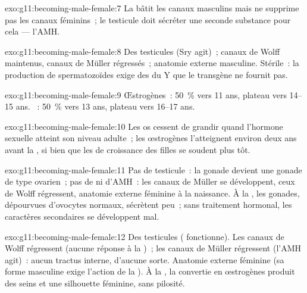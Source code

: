 \begin{solution}{exo:g11:becoming-male-female:7}
La  bâtit les canaux masculins mais ne supprime pas les
canaux féminins~; le testicule doit sécréter une seconde substance pour
cela --- l'AMH.
\end{solution}

\begin{solution}{exo:g11:becoming-male-female:8}
Des testicules (Sry agit)~; canaux de Wolff maintenus, canaux de Müller
régressés~; anatomie externe masculine. Stérile~: la production de
spermatozoïdes exige des  du Y que le transgène ne fournit pas.
\end{solution}

\begin{solution}{exo:g11:becoming-male-female:9}
Œstrogènes~: 50~\% vers 11 ans, plateau vers 14--15 ans.
~: 50~\% vers 13 ans, plateau vers 16--17 ans.
\end{solution}

\begin{solution}{exo:g11:becoming-male-female:10}
Les os cessent de grandir quand l'hormone sexuelle atteint son niveau
adulte~; les œstrogènes l'atteignent environ deux ans avant la
, si bien que les  de croissance des filles se
soudent plus tôt.
\end{solution}

\begin{solution}{exo:g11:becoming-male-female:11}
Pas de testicule~: la gonade devient une gonade de type ovarien~; pas
de  ni d'AMH~: les canaux de Müller se développent, ceux de
Wolff régressent, anatomie externe féminine à la naissance. À la
, les gonades, dépourvues d'ovocytes normaux, sécrètent peu~;
sans traitement hormonal, les caractères secondaires se développent
mal.
\end{solution}

\begin{solution}{exo:g11:becoming-male-female:12}
Des testicules ( fonctionne). Les canaux de Wolff régressent (aucune
réponse à la )~; les canaux de Müller régressent (l'AMH
agit)~: aucun tractus interne, d'aucune sorte. Anatomie externe
féminine (sa forme masculine exige l'action de la ). À la
, la  convertie en œstrogènes produit des seins et
une silhouette féminine, sans pilosité.
\end{solution}

